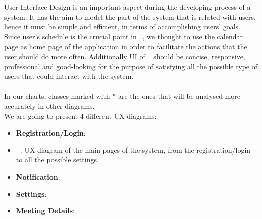 User Interface Design is an important aspect during the developing process of a system. It has the aim to model the part of the system that is related with users, hence it must be simple and efficient, in terms of accomplishing users' goals. Since user's schedule is the crucial point in \projectname~, we thought to use the calendar page as home page of the application in order to facilitate the actions that the user should do more often. Additionally UI of \projectname~ should be concise, responsive, professional and good-looking for the purpose of satisfying all the possible type of users that could interact with the system.\\
\\
In our charts, classes marked with * are the ones that will be analysed more accurately in other diagrams.\\
We are going to present 4 different UX diagrams:
\begin{itemize}
	\item{\textbf{Registration/Login}}:
	\item{\textbf{\projectname~}}: UX diagram of the main pages of the system, from the registration/login to all the possible settings. 
	\item{\textbf{Notification}}:
	\item{\textbf{Settings}}:
	\item{\textbf{Meeting Details}}:
\end{itemize}